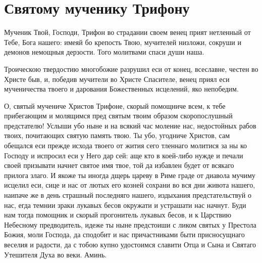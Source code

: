 \mychapterending


 
\section{Святому мученику Трифону}\begin{mymulticols}
 


Мученик Твой, Господи, Трифон во страдании своем венец прият нетленный от Тебе, Бога нашего: имеяй бо крепость Твою, мучителей низложи, сокруши и демонов немощныя дерзости. Того молитвами спаси души наша.


Троическою твердостию многобожие разрушил еси от конец, всеславне, честен во Христе быв, и, победив мучители во Христе Спасителе, венец приял еси мученичества твоего и дарования Божественных исцелений, яко непобедим.


О, святый мучениче Христов Трифоне, скорый помощниче всем, к тебе прибегающим и молящимся пред святым твоим образом скоропослушный предстателю! Услыши убо ныне и на всякий час моление нас, недостойных рабов твоих, почитающих святую память твою. Ты убо, угодниче Христов, сам обещался еси прежде исхода твоего от жития сего тленнаго молитися за ны ко Господу и испросил еси у Него дар сей: аще кто в коей-либо нужде и печали своей призывати начнет святое имя твое, той да избавлен будет от всякаго прилога злаго. И якоже ты иногда дщерь цареву в Риме граде от диавола мучиму исцелил еси, сице и нас от лютых его козней сохрани во вся дни живота нашего, наипаче же в день страшный последняго нашего, издыхания предстательствуй о нас, егда темнии зраки лукавых бесов окружати и устрашати нас начнут. Буди нам тогда помощник и скорый прогонитель лукавых бесов, и к Царствию Небесному предводитель, идеже ты ныне предстоиши с ликом святых у Престола Божия, моли Господа, да сподобит и нас причастниками быти присносущнаго веселия и радости, да с тобою купно удостоимся славити Отца и Сына и Святаго Утешителя Духа во веки. Аминь. 

\end{mymulticols}

